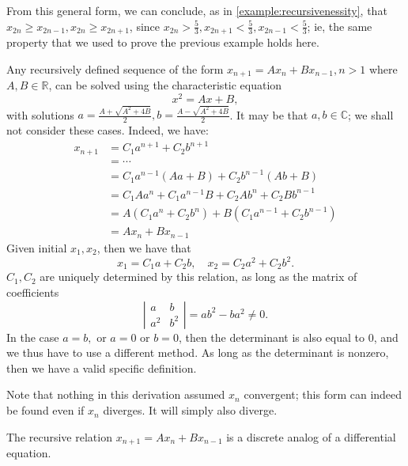 \documentclass[12pt]{article}
\begin{document}
\begin{remark}
  From this general form, we can conclude, as in \cref{example:recursivenessity}, that $x_{2n} \geq x_{2n-1}, x_{2n} \geq x_{2n+1}$, since $x_{2n} > \frac{5}{3}, x_{2n+1} < \frac{5}{3}, x_{2n-1} < \frac{5}{3}$; ie, the same property that we used to prove the previous example holds here.
\end{remark}

\begin{remark}
  Any recursively defined sequence of the form $x_{n+1} = A x_{n} + B x_{n-1}, n > 1$ where $A, B \in \mathbb{R}$, can be solved using the characteristic equation \[x^2 = A x + B,\] with solutions $a = \frac{A + \sqrt{A^2 + 4B}}{2}, b = \frac{A - \sqrt{A^2 + 4B}}{2}$. It may be that $a,b \in \mathbb{C}$; we shall not consider these cases. Indeed, we have: \begin{align*}
    x_{n+1} &= C_1 a^{n+1} + C_2 b^{n+1}\\
    &= \cdots \\
    &= C_1 a^{n-1}(Aa + B) + C_2b^{n-1} (Ab+B)\\
    &= C_1 A a^{n}  + C_1 a^{n-1} B + C_2 A b^n + C_2 B b^{n-1}\\
    &= A (C_1a^{n} + C_2 b^n) + B(C_1 a^{n-1} + C_2 b^{n-1})\\
    &= A x_n + B x_{n-1}
  \end{align*}
  Given initial $x_1, x_2$, then we have that \[x_1 = C_1 a + C_2 b, \quad x_2 = C_2 a^2 + C_2 b^2.\]
  $C_1, C_2$ are uniquely determined by this relation, as long as the matrix of coefficients \[\left|\begin{matrix}
    a & b \\
    a^2 & b^2
  \end{matrix}\right| = ab^2 - ba^2 \neq 0.\] In the case $a = b,$ or $a = 0$ or $b = 0$, then the determinant is also equal to $0$, and we thus have to use a different method. As long as the determinant is nonzero, then we have a valid specific definition. 
\end{remark}

\begin{remark}
  Note that nothing in this derivation assumed $x_n$ convergent; this form can indeed be found even if $x_n$ diverges. It will simply also diverge.
\end{remark}

\begin{remark}
  The recursive relation $x_{n+1} = A x_{n} + B x_{n-1}$ is a discrete analog of a differential equation.
\end{remark}
\end{document}
